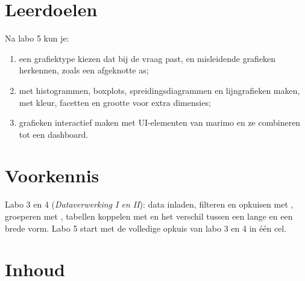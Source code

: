 \documentclass[11pt,a4paper]{article}
\begin{document}



\section{Leerdoelen}

Na labo 5 kun je:

\begin{enumerate}[label=\textbf{LD\arabic*}, leftmargin=1.4cm]
  \item een grafiektype kiezen dat bij de vraag past, en misleidende
        grafieken herkennen, zoals een afgeknotte as;
  \item met  histogrammen, boxplots,
        spreidingsdiagrammen en lijngrafieken maken, met kleur, facetten
        en grootte voor extra dimensies;
  \item grafieken interactief maken met UI-elementen van marimo en ze
        combineren tot een dashboard.
\end{enumerate}

\section{Voorkennis}

Labo 3 en 4 (\emph{Dataverwerking I en II}): data inladen, filteren en
opkuisen met , groeperen met , tabellen
koppelen met  en het verschil tussen een lange en een brede
vorm. Labo 5 start met de volledige opkuis van labo 3 en 4 in één cel.





\section{Inhoud}


\end{document}

